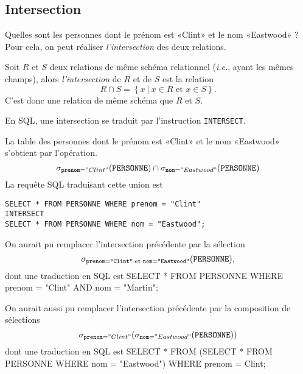\subsection{Intersection}

Quelles sont les personnes dont le prénom est «Clint» et le nom
«Eastwood» ? Pour cela, on peut réaliser  \emph{l'intersection} des deux relations.
\begin{defi}[Intersection]
  Soit $R$ et $S$ deux relations de même schéma relationnel (\emph{i.e.}, ayant les mêmes champs), alors \emph{l'intersection} de $R$ et de $S$ est la relation 
  \begin{equation*}
    R\cap S = \left\{x ~|~ x\in R\textrm{ et }x\in S\right\}.
  \end{equation*}
  C'est donc une relation de même schéma que $R$ et $S$.
\end{defi}

En SQL, une intersection se traduit par l'instruction \texttt{INTERSECT}.
\begin{exemple}
La table des personnes dont le prénom est «Clint» et le nom «Eastwood» s'obtient par l'opération.
\begin{equation*}
  \sigma_{\mathtt{prenom}="Clint"}(\mathtt{PERSONNE})\cap \sigma_{\mathtt{nom}="Eastwood"}(\mathtt{PERSONNE})
\end{equation*}
La requête SQL traduisant cette union est 
\begin{verbatim}
SELECT * FROM PERSONNE WHERE prenom = "Clint"
INTERSECT
SELECT * FROM PERSONNE WHERE nom = "Eastwood";
\end{verbatim}
\end{exemple}

\begin{rem}
  On aurait pu remplacer l'intersection précédente par la sélection 
  \begin{equation*}
    \sigma_{\mathtt{prenom}=\texttt{"Clint"}\textrm{ et }\mathtt{nom}=\texttt{"Eastwood"}}(\mathtt{PERSONNE}),
  \end{equation*}
  dont une traduction en SQL est 
SELECT * 
FROM PERSONNE
WHERE prenom = "Clint"
      AND 
      nom = "Martin";
\end{rem}

\begin{rem}
  On aurait aussi pu remplacer l'intersection précédente par la composition de sélections
  \begin{equation*}
    \sigma_{\mathtt{prenom}="Clint"}(\sigma_{\mathtt{nom}="Eastwood"}(\mathtt{PERSONNE}))
  \end{equation*}
  dont une traduction en SQL est 
SELECT * 
FROM (SELECT *
      FROM PERSONNE
      WHERE nom = "Eastwood")
WHERE prenom = Clint;
\end{rem}

